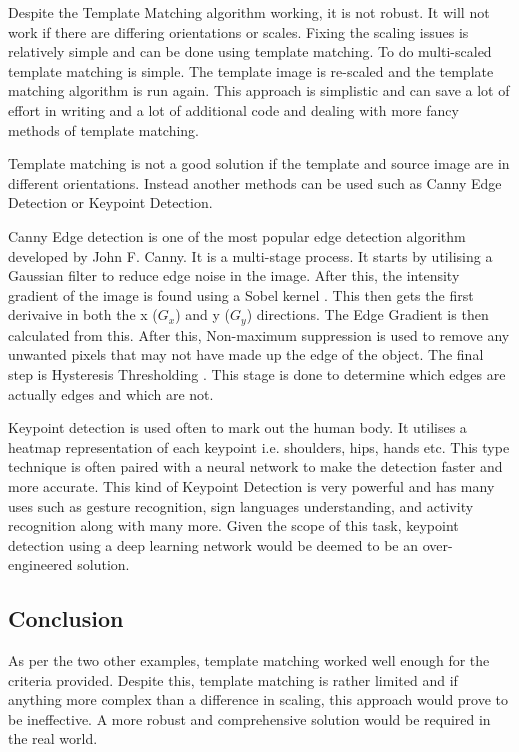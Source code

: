 \documentclass[conference]{IEEEtran}
\begin{document}
Despite the Template Matching algorithm working, it is not robust. It will not work if there are differing orientations or scales. Fixing the scaling issues is relatively simple and can be done using template matching. To do multi-scaled template matching is simple. The template image is re-scaled and the template matching algorithm is run again. \cite{ref:open_cv_templae_matching_scaling} This approach is simplistic and can save a lot of effort in writing and a lot of additional code and dealing with more fancy methods of template matching. 

Template matching is not a good solution if the template and source image are in different orientations. Instead another methods can be used such as Canny Edge Detection or Keypoint Detection. 

Canny Edge detection is one of the most popular edge detection algorithm developed by John F. Canny. It is a multi-stage process. It starts by utilising a Gaussian filter \cite{ref:Gaussian_filters} to reduce edge noise in the image. After this, the intensity gradient of the image is found using a Sobel kernel \cite{ref:sobel_kernal}. This then gets the first derivaive in both the x ($G_x$) and y ($G_y$) directions. The Edge Gradient is then calculated from this.  After this, Non-maximum suppression \cite{ref:non-maximum_supression} is used to remove any unwanted pixels that may not have made up the edge of the object. The final step is Hysteresis Thresholding \cite{ref:hysteresis_thresholding}. This stage is done to determine which edges are actually edges and which are not. 

Keypoint detection is used often to mark out the human body. It utilises a heatmap representation of each keypoint i.e. shoulders, hips, hands etc. \cite{ref:keypoint_detection} This type technique is often paired with a neural network to make the detection faster and more accurate. This kind of Keypoint Detection is very powerful and has many uses such as gesture recognition, sign languages understanding, and activity recognition along with many more. \cite{ref:keypoint_detection_using_deep_learning} Given the scope of this task, keypoint detection using a deep learning network would be deemed to be an over-engineered solution.

\subsection{Conclusion}

As per the two other examples, template matching worked well enough for the criteria provided. Despite this, template matching is rather limited and if anything more complex than a difference in scaling, this approach would prove to be ineffective. A more robust and comprehensive solution would be required in the real world.
\end{document}
